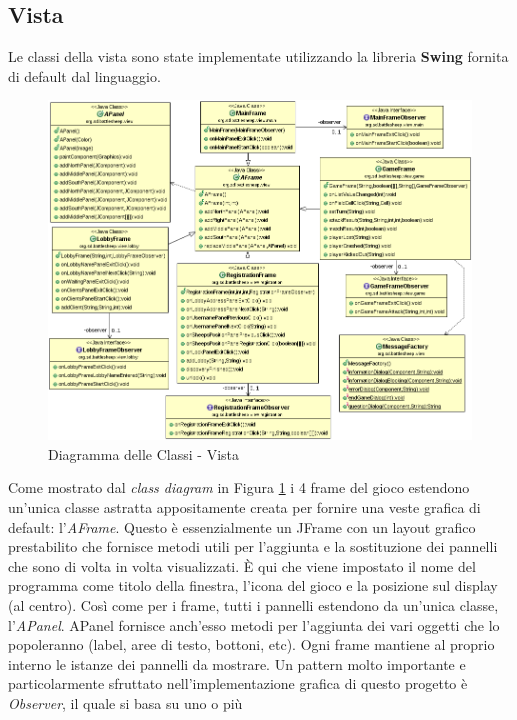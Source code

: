\subsection{Vista}
Le classi della vista sono state implementate utilizzando la libreria
\textbf{Swing} fornita di default dal linguaggio.
\begin{figure}[!ht]
	\centering
	\includegraphics[scale=0.45,center]{core/imgs/UML/VistaBellaUML-noattr.png}
	\caption{Diagramma delle Classi - Vista}
	\label{figure:class_diagram_view}
\end{figure}
Come mostrato dal \textit{class diagram} in Figura \ref{figure:class_diagram_view} 
i 4 frame del gioco estendono un'unica
classe astratta appositamente creata per fornire una veste grafica di default:
l'\textit{AFrame}. Questo è essenzialmente un JFrame con un layout grafico
prestabilito che fornisce metodi utili per l'aggiunta e la sostituzione dei
pannelli che sono di volta in volta visualizzati. È qui che viene impostato il
nome del programma come titolo della finestra, l'icona del gioco e la posizione sul display (al centro).\newline
Così come per i frame, tutti i pannelli estendono da un'unica classe,
l'\textit{APanel}. APanel fornisce anch'esso metodi per l'aggiunta dei vari oggetti che
lo popoleranno (label, aree di testo, bottoni, etc). Ogni frame mantiene al
proprio interno le istanze dei pannelli da mostrare.\newline
Un pattern molto importante e particolarmente sfruttato nell'implementazione
grafica di questo progetto è \textit{Observer}, il quale si basa su uno o più
